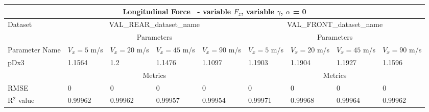         \begin{tabular}{lllll|llll} \hline \multicolumn{9}{c}{Longitudinal Force~ - variable $F_z$, variable $\gamma$, $\alpha$ = 0}                                                                                                                                                                   \\ \hline Dataset                         & \multicolumn{4}{c|}{VAL\_REAR\_dataset\_name}                                                & \multicolumn{4}{c}{VAL\_FRONT\_dataset\_name}                                                     \\ \hline \multicolumn{1}{c}{}            & \multicolumn{4}{c|}{Parameters}                                                              & \multicolumn{4}{c}{Parameters}                                                                    \\ \hline Parameter Name                  & $V_x = 5$ m/s     & $V_x = 20$ m/s     & $V_x = 45$ m/s     & $V_x = 90$ m/s     & $V_x = 5$ m/s      & $V_x = 20$ m/s      & $V_x = 45$ m/s      & $V_x = 90$ m/s       \\ pDx3                            & 1.1564 & 1.2 & 1.1476 & 1.1097 & 1.1903 & 1.1904 & 1.1927 & 1.1596  \\ \hline \multicolumn{1}{c}{}            & \multicolumn{4}{c}{Metrics}                                                                  & \multicolumn{4}{c}{Metrics}                                                                       \\ RMSE                            & 0 & 0 & 0 & 0 & 0 & 0 & 0 & 0  \\ R$^2$ value                       & 0.99962   & 0.99962   & 0.99957   & 0.99954   & 0.99971   & 0.99968   & 0.99964   & 0.99962    \\ \hline \end{tabular} 